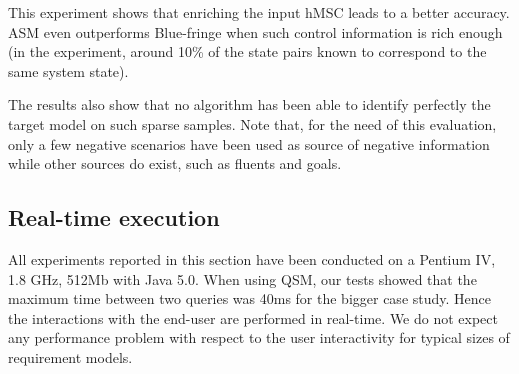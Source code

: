 This experiment shows that enriching the input hMSC leads to a better accuracy. ASM even outperforms Blue-fringe when such control information is rich enough (in the experiment, around 10\% of the state pairs known to correspond to the same system state). 

The results also show that no algorithm has been able to identify perfectly the target model on such sparse samples. Note that, for the need of this evaluation, only a few negative scenarios have been used as source of negative information while other sources do exist, such as fluents and goals.


\subsection{Real-time execution}

All experiments reported in this section have been conducted on a Pentium IV, 1.8 GHz, 512Mb with Java 5.0. When using QSM, our tests showed that the maximum time between two queries was 40ms for the bigger case study. Hence the interactions with the end-user are performed in real-time. We do not expect any performance problem with respect to the user interactivity for typical sizes of requirement models.

